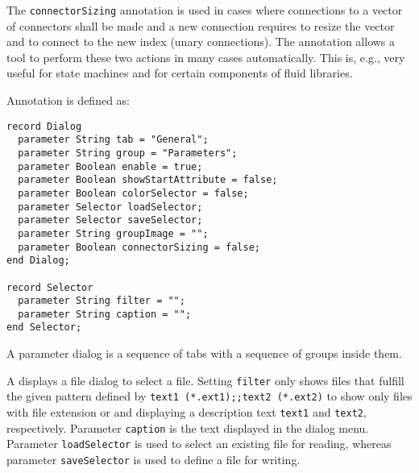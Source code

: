 \begin{nonnormative}
The \lstinline!connectorSizing! annotation is used in cases
where connections to a vector of connectors shall be made and a new
connection requires to resize the vector and to connect to the new index
(unary connections). The annotation allows a tool to perform these two
actions in many cases automatically. This is, e.g., very useful for
state machines and for certain components of fluid libraries.
\end{nonnormative}

Annotation  is defined as:
\begin{lstlisting}[language=modelica]
record Dialog
  parameter String tab = "General";
  parameter String group = "Parameters";
  parameter Boolean enable = true;
  parameter Boolean showStartAttribute = false;
  parameter Boolean colorSelector = false;
  parameter Selector loadSelector;
  parameter Selector saveSelector;
  parameter String groupImage = "";
  parameter Boolean connectorSizing = false;
end Dialog;

record Selector
  parameter String filter = "";
  parameter String caption = "";
end Selector;
\end{lstlisting}
A parameter dialog is a sequence of tabs with a sequence of groups inside them.

A  displays a file dialog to select a file.
Setting \lstinline!filter! only shows files that fulfill the given pattern defined by \lstinline!text1 (*.ext1);;text2 (*.ext2)! to show only files with file extension  or  and displaying a description text \lstinline!text1! and \lstinline!text2!, respectively.
Parameter \lstinline!caption! is the text displayed in the dialog menu.
Parameter \lstinline!loadSelector! is used to select an existing file for reading, whereas parameter \lstinline!saveSelector! is used to define a file for writing.

